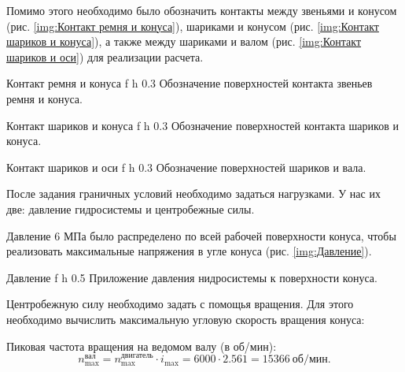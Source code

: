 Помимо этого необходимо было обозначить контакты между звеньями и конусом (рис. \ref{img:Контакт ремня и конуса}), шариками и конусом (рис. \ref{img:Контакт шариков и конуса}), а также между шариками и валом (рис. \ref{img:Контакт шариков и оси}) для реализации расчета.

    {Контакт ремня и конуса} %
    {f} %
    {h} %
    {0.3\textwidth} %
    {Обозначение поверхностей контакта звеньев ремня и конуса.} %

    {Контакт шариков и конуса} %
    {f} %
    {h} %
    {0.3\textwidth} %
    {Обозначение поверхностей контакта шариков и конуса.} %

    {Контакт шариков и оси} %
    {f} %
    {h} %
    {0.3\textwidth} %
    {Обозначение поверхностей шариков и вала.} %

\newpage

После задания граничных условий необходимо задаться нагрузками. У нас их две: давление гидросистемы и центробежные силы.

Давление 6 МПа было распределено по всей рабочей поверхности конуса, чтобы реализовать максимальные напряжения в угле конуса (рис. \ref{img:Давление}).

    {Давление} %
    {f} %
    {h} %
    {0.5\textwidth} %
    {Приложение давления нидросистемы к поверхности конуса.} %

\newpage

Центробежную силу необходимо задать с помощья вращения. Для этого необходимо вычислить максимальную угловую скорость вращения конуса:

Пиковая частота вращения на ведомом валу (в об/мин):
\[
n_{\max}^{\text{вал}} = n_{\max}^{\text{двигатель}}\cdot i_{\max}
= 6000 \cdot 2.561 = 15366\ \text{об/мин}.
\]

